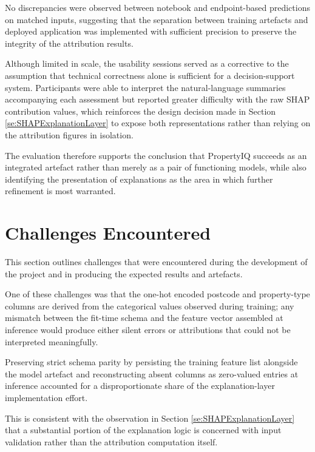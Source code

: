 No discrepancies were observed between notebook and endpoint-based predictions on matched inputs, suggesting that the separation between training artefacts and deployed application was implemented with sufficient precision to preserve the integrity of the attribution results.

Although limited in scale, the usability sessions served as a corrective to the assumption that technical correctness alone is sufficient for a decision-support system. Participants were able to interpret the natural-language summaries accompanying each assessment but reported greater difficulty with the raw SHAP contribution values, which reinforces the design decision made in Section \ref{se:SHAPExplanationLayer}  to expose both representations rather than relying on the attribution figures in isolation. 

The evaluation therefore supports the conclusion that PropertyIQ succeeds as an integrated artefact rather than merely as a pair of functioning models, while also identifying the presentation of explanations as the area in which further refinement is most warranted.

\section{Challenges Encountered}

This section outlines challenges that were encountered during the development of the project and in producing the expected results and artefacts.

One of these challenges was that the one-hot encoded postcode and property-type columns are derived from the categorical values observed during training; any mismatch between the fit-time schema and the feature vector assembled at inference would produce either silent errors or attributions that could not be interpreted meaningfully. 

Preserving strict schema parity by persisting the training feature list alongside the model artefact and reconstructing absent columns as zero-valued entries at inference accounted for a disproportionate share of the explanation-layer implementation effort. 

This is consistent with the observation in Section \ref{se:SHAPExplanationLayer}  that a substantial portion of the explanation logic is concerned with input validation rather than the attribution computation itself.

